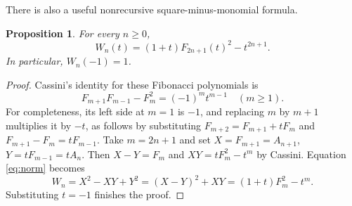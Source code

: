 \documentclass[11pt]{article}
\numberwithin{equation}{section}
\newtheorem{proposition}[theorem]{Proposition}
\theoremstyle{definition}
\begin{document}
There is also a useful nonrecursive square-minus-monomial formula.

\begin{proposition}\label{prop:squareminus}
For every $n\geq0$,
\begin{equation}\label{eq:squareminus}
 W_n(t)=(1+t)F_{2n+1}(t)^2-t^{2n+1}.
\end{equation}
In particular, $W_n(-1)=1$.
\end{proposition}
\begin{proof}
Cassini's identity for these Fibonacci polynomials is
\[
 F_{m+1}F_{m-1}-F_m^2=(-1)^m t^{m-1}\quad(m\geq1).
\]
For completeness, its left side at $m=1$ is $-1$, and replacing $m$ by
$m+1$ multiplies it by $-t$, as follows by substituting
$F_{m+2}=F_{m+1}+tF_m$ and $F_{m+1}-F_m=tF_{m-1}$.
Take $m=2n+1$ and set $X=F_{m+1}=A_{n+1}$,
$Y=tF_{m-1}=tA_n$.  Then $X-Y=F_m$ and
$XY=tF_m^2-t^m$ by Cassini.  Equation \eqref{eq:norm} becomes
\[
 W_n=X^2-XY+Y^2=(X-Y)^2+XY=(1+t)F_m^2-t^m.
\]
Substituting $t=-1$ finishes the proof.
\end{proof}
\end{document}
